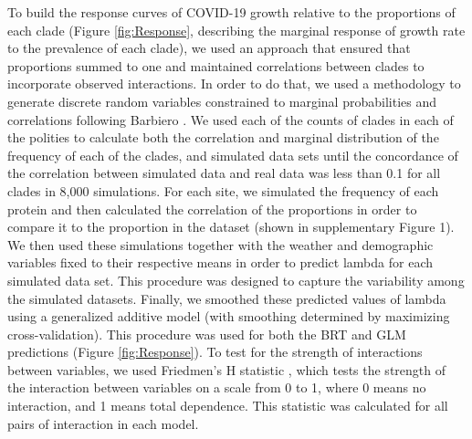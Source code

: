 \documentclass[9pt,twocolumn,twoside,lineno]{pnas-new}
\begin{document}
{To build the response curves of COVID-19 growth relative to the proportions of each clade (Figure \ref{fig:Response}, describing the marginal response of growth rate to the prevalence of each clade), we used an approach that ensured that proportions summed to one and maintained correlations between clades to incorporate observed interactions. In order to do that, we used a methodology to generate discrete random variables constrained to marginal probabilities and correlations following Barbiero \cite{Barbiero2017-dw}. We used each of the counts of clades in each of the polities to calculate both the correlation and marginal distribution of the frequency of each of the clades, and simulated data sets until the concordance of the correlation between simulated data and real data was less than 0.1 for all clades in 8,000 simulations. For each site, we simulated the frequency of each protein and then calculated the correlation of the proportions in order to compare it to the proportion in the dataset (shown in supplementary Figure 1).  We then used these simulations together with the weather and demographic variables fixed to their respective means in order to predict lambda for each simulated data set. This procedure was designed to capture the variability among the simulated datasets. Finally, we smoothed these predicted values of lambda using a generalized additive model (with smoothing determined by maximizing cross-validation). This procedure was used for both the BRT and GLM predictions (Figure \ref{fig:Response}).
To test for the strength of interactions between variables, we used Friedmen’s H statistic \cite{Friedman2008-ep}, which tests the strength of the interaction between variables on a scale from 0 to 1, where 0 means no interaction, and 1 means total dependence. This statistic was calculated for all pairs of interaction in each model. 

}

\showmatmethods{} %


\showacknow{} %


\end{document}
